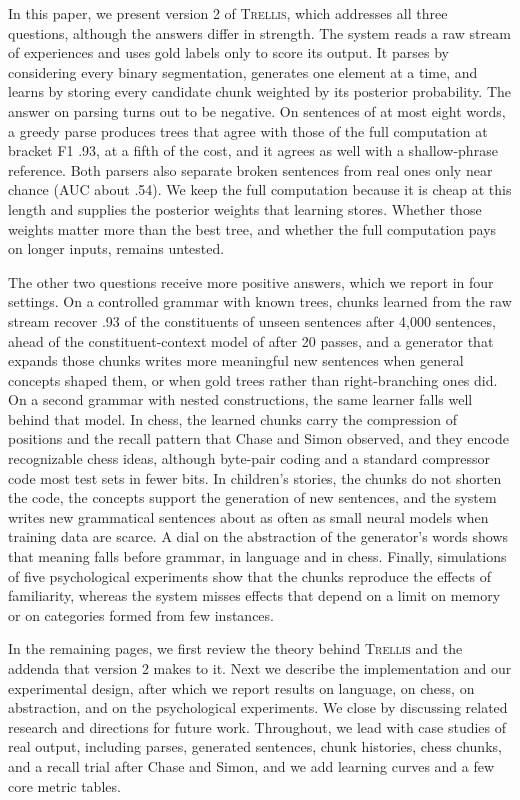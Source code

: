 \documentclass[11pt,letterpaper]{article}
\newcommand{\trellis}{\textsc{Trellis}}
\begin{document}
In this paper, we present version 2 of \trellis{}, which addresses all three questions,
although the answers differ in strength. The system reads a raw stream of experiences
and uses gold labels only to score its output. It parses by considering every binary
segmentation, generates one element at a time, and learns by storing every candidate
chunk weighted by its posterior probability. The answer on parsing turns out to be
negative. On sentences of at most eight words, a greedy parse produces trees that agree
with those of the full computation at bracket F1 .93, at a fifth of the cost, and it
agrees as well with a shallow-phrase reference. Both parsers also separate broken
sentences from real ones only near chance (AUC about .54). We keep the full computation
because it is cheap at this length and supplies the posterior weights that learning
stores. Whether those weights matter more than the best tree, and whether the full
computation pays on longer inputs, remains untested.

The other two questions receive more positive answers, which we report in four
settings. On a controlled grammar with known trees, chunks learned from the raw stream
recover .93 of the constituents of unseen sentences after 4,000 sentences, ahead of the
constituent-context model of \citet{klein-manning-ccm} after 20 passes, and a
generator that expands those chunks writes more meaningful new sentences when general
concepts shaped them, or when gold trees rather than right-branching ones did.
On a second grammar with nested constructions, the same learner falls well behind that
model. In chess, the learned chunks carry the compression of positions and the
recall pattern that Chase and Simon observed, and they encode recognizable chess ideas,
although byte-pair coding and a standard compressor code most test sets in fewer bits.
In children's stories, the chunks do not shorten the code, the concepts support the
generation of new sentences, and the system writes new grammatical sentences about as
often as small neural models when training data are scarce. A dial on the abstraction
of the generator's words shows that meaning falls before grammar, in language and in
chess. Finally, simulations of five psychological experiments show that the chunks
reproduce the effects of familiarity, whereas the system misses effects that depend on
a limit on memory or on categories formed from few instances.

In the remaining pages, we first review the theory behind \trellis{} and the addenda
that version 2 makes to it. Next we describe the implementation and our experimental
design, after which we report results on language, on chess, on abstraction, and on the
psychological experiments. We close by discussing related research and directions for
future work. Throughout, we lead with case studies of real output, including parses,
generated sentences, chunk histories, chess chunks, and a recall trial after Chase and
Simon, and we add learning curves and a few core metric tables.
\end{document}
